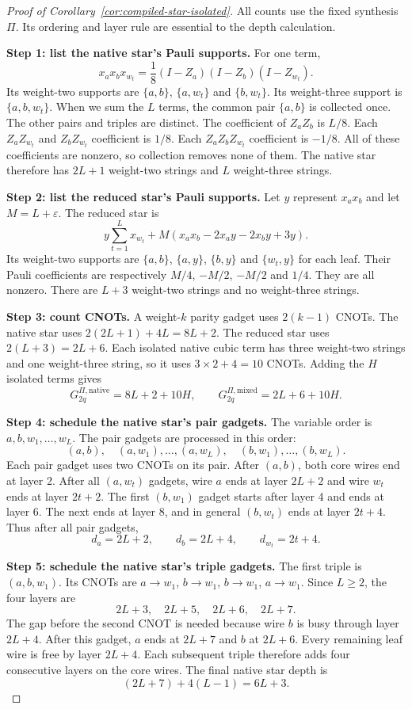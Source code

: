 \documentclass[a4paper,onecolumn,11pt,unpublished]{quantumarticle}
\theoremstyle{remark}
\begin{document}
\begin{proof}[Proof of Corollary~\ref{cor:compiled-star-isolated}]
All counts use the fixed synthesis $\Pi$. Its ordering and layer rule are
essential to the depth calculation.

\textbf{Step 1: list the native star's Pauli supports.}
For one term,
\[
x_ax_bx_{w_t}
=\frac18(I-Z_a)(I-Z_b)(I-Z_{w_t}).
\]
Its weight-two supports are $\{a,b\}$, $\{a,w_t\}$ and $\{b,w_t\}$.
Its weight-three support is $\{a,b,w_t\}$.
When we sum the $L$ terms, the common pair $\{a,b\}$ is collected once.
The other pairs and triples are distinct.
The coefficient of $Z_aZ_b$ is $L/8$.
Each $Z_aZ_{w_t}$ and $Z_bZ_{w_t}$ coefficient is $1/8$.
Each $Z_aZ_bZ_{w_t}$ coefficient is $-1/8$.
All of these coefficients are nonzero, so collection removes none of them.
The native star therefore has $2L+1$ weight-two strings and $L$
weight-three strings.

\textbf{Step 2: list the reduced star's Pauli supports.}
Let $y$ represent $x_ax_b$ and let $M=L+\varepsilon$.
The reduced star is
\[
y\sum_{t=1}^Lx_{w_t}
+M(x_ax_b-2x_ay-2x_by+3y).
\]
Its weight-two supports are $\{a,b\}$, $\{a,y\}$, $\{b,y\}$ and
$\{w_t,y\}$ for each leaf. Their Pauli coefficients are respectively
$M/4$, $-M/2$, $-M/2$ and $1/4$.
They are all nonzero. There are $L+3$ weight-two strings and no
weight-three strings.

\textbf{Step 3: count CNOTs.}
A weight-$k$ parity gadget uses $2(k-1)$ CNOTs.
The native star uses $2(2L+1)+4L=8L+2$.
The reduced star uses $2(L+3)=2L+6$.
Each isolated native cubic term has three weight-two strings and one
weight-three string, so it uses $3\times2+4=10$ CNOTs.
Adding the $H$ isolated terms gives
\[
 G_{2q}^{\Pi,\mathrm{native}}=8L+2+10H,
 \qquad G_{2q}^{\Pi,\mathrm{mixed}}=2L+6+10H.
\]

\textbf{Step 4: schedule the native star's pair gadgets.}
The variable order is $a,b,w_1,\ldots,w_L$.
The pair gadgets are processed in this order:
\[
(a,b),\quad (a,w_1),\ldots,(a,w_L),\quad
(b,w_1),\ldots,(b,w_L).
\]
Each pair gadget uses two CNOTs on its pair.
After $(a,b)$, both core wires end at layer 2.
After all $(a,w_t)$ gadgets, wire $a$ ends at layer $2L+2$ and
wire $w_t$ ends at layer $2t+2$.
The first $(b,w_1)$ gadget starts after layer 4 and ends at layer 6.
The next ends at layer 8, and in general $(b,w_t)$ ends at layer $2t+4$.
Thus after all pair gadgets,
\[
d_a=2L+2,\qquad d_b=2L+4,\qquad d_{w_t}=2t+4.
\]

\textbf{Step 5: schedule the native star's triple gadgets.}
The first triple is $(a,b,w_1)$.
Its CNOTs are $a\to w_1$, $b\to w_1$, $b\to w_1$, $a\to w_1$.
Since $L\geq2$, the four layers are
\[
2L+3,\quad 2L+5,\quad 2L+6,\quad 2L+7.
\]
The gap before the second CNOT is needed because wire $b$ is busy through
layer $2L+4$.
After this gadget, $a$ ends at $2L+7$ and $b$ at $2L+6$.
Every remaining leaf wire is free by layer $2L+4$.
Each subsequent triple therefore adds four consecutive layers on the core
wires. The final native star depth is
\[
(2L+7)+4(L-1)=6L+3.
\]


\end{proof}
\end{document}
